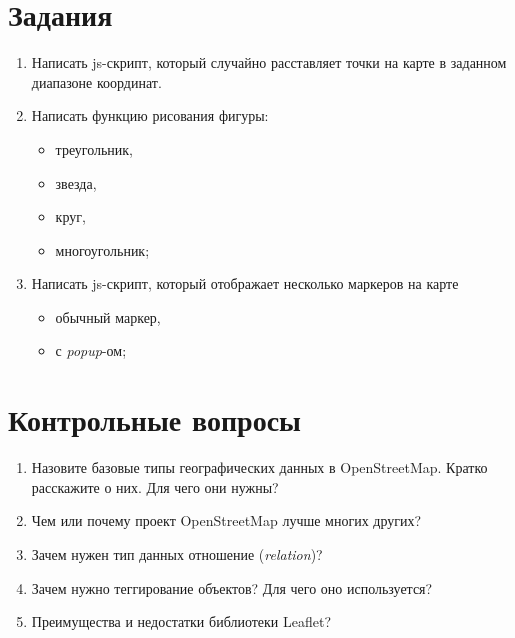 \chapter{Задания}
\begin{enumerate}
    \item Написать js-скрипт, который случайно расставляет точки на карте 
        в заданном диапазоне координат.
    \item Написать функцию рисования фигуры:
    \begin{itemize}
        \item треугольник,
        \item звезда,
        \item круг,
        \item многоугольник;
    \end{itemize}
    \item Написать js-скрипт, который отображает несколько маркеров на карте
    \begin{itemize}
        \item обычный маркер,
        \item с \emph{popup}-ом;
    \end{itemize}
\end{enumerate}

\chapter{Контрольные вопросы}
\begin{enumerate}
    \item Назовите базовые типы географических данных в OpenStreetMap. 
        Кратко расскажите о них. Для чего они нужны?
    \item Чем или почему проект OpenStreetMap лучше многих других?
    \item Зачем нужен тип данных отношение (\emph{relation})?
    \item Зачем нужно теггирование объектов? Для чего оно используется?
    \item Преимущества и недостатки библиотеки Leaflet?
\end{enumerate}

